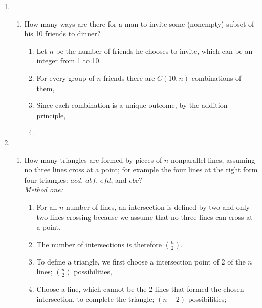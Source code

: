 \documentclass[12pt]{amsart}
\begin{document}
\begin{enumerate}
\item \begin{enumerate}\item How many ways are there for a man to invite some (nonempty) subset of his
10 friends to dinner?
        \begin{enumerate}
        \item Let $n$ be the number of friends he chooses to invite, which can be an integer from 1 to 10.
        \item For every group of $n$ friends there are $C(10, n)$ combinations of them,
        \item Since each combination is a unique outcome, by the addition principle,
        \item {}
        \end{enumerate}
    \end{enumerate} 
    
\item \begin{enumerate}
    \item How many triangles are formed by
pieces of $n$ nonparallel lines, assuming
no three lines cross at a point; for example
the four lines at the right form
four triangles: $acd$, $abf$, $efd$, and $ebc$?\\
    \emph{\underline{Method one:}}
    \begin{enumerate}
        \item For all $n$ number of lines, an intersection is defined by two and only two lines crossing because we assume that no three lines can cross at a point.
        \item The number of intersections is therefore $\binom{n}{2}$.
        \item To define a triangle, we first choose a intersection point of 2 of the $n$ lines; $\binom{n}{2}$ possibilities,
        \item Choose a line, which cannot be the 2 lines that formed the chosen intersection, to complete the triangle; $(n-2)$ possibilities;


\end{enumerate}
\end{enumerate}
\end{enumerate}
\end{document}
